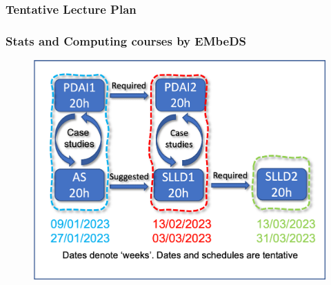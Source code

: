 \documentclass{beamer}%
\begin{document}
\begin{frame}
  \frametitle{Tentative Lecture Plan}
  \centering
    
\end{frame}

\begin{frame}
	\frametitle{Stats and Computing courses by EMbeDS}
	\centering
\begin{figure}
	\includegraphics[width=0.9\linewidth]{../../tentativeSchedule.png}
\end{figure} 
\end{frame}



%  
\end{document}
